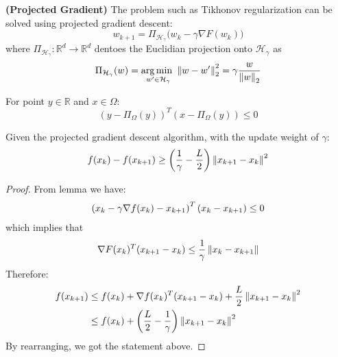 \begin{definition}{\textbf{(Projected Gradient)}}
    The problem such as Tikhonov regularization can be solved using projected gradient descent:
    \begin{equation*}
        w_{k+1} = \Pi_{\mathcal{H}_\gamma} \Big( w_k - \gamma\nabla F(w_k) \Big)
    \end{equation*}
    where $\Pi_{\mathcal{H}_\gamma} : \mathbb{R}^d\rightarrow \mathbb{R}^d$ dentoes the Euclidian projection onto $\mathcal{H}_\gamma$ as 
    \begin{equation*}
        \Pi_{\mathcal{H}_\gamma}(w) = \underset{w'\in\mathcal{H}_\gamma}{\arg\min \ }\left\lVert w-w'\right\rVert^2_2 = \gamma\frac{w}{\left\lVert w\right\rVert_2}
    \end{equation*}
\end{definition}

\begin{lemma}
    For point $y\in \mathbb{R}$ and $x\in\Omega$:
    \begin{equation*}
        (y-\Pi_\Omega(y))^T(x - \Pi_\Omega(y)) \le 0
    \end{equation*}
\end{lemma}

\begin{lemma}
    Given the projected gradient descent algorithm, with the update weight of $\gamma$:
    \begin{equation*}
        f(x_k) - f(x_{k+1}) \ge \left( \frac{1}{\gamma} - \frac{L}{2} \right)\left\lVert x_{k+1} - x_k\right\rVert^2
    \end{equation*}
\end{lemma}
\begin{proof}
    From lemma we have:
    \begin{equation*}
    \begin{aligned}
        \left( x_k - \gamma\nabla f(x_k) - x_{k+1} \right)^T(x_k - x_{k+1} ) \le 0
    \end{aligned}
    \end{equation*}
    which implies that 
    \begin{equation*}
        \nabla F(x_k)^T(x_{k+1} - x_k) \le \frac{1}{\gamma}\left\lVert x_k - x_{k+1}\right\rVert
    \end{equation*}
    Therefore:
    \begin{equation*}
    \begin{aligned}
        f(x_{k+1}) &\le f(x_k) + \nabla f(x_k)^T(x_{k+1} - x_k) + \frac{L}{2}\left\lVert x_{k+1} - x_k\right\rVert^2 \\ 
        &\le f(x_k) + \left( \frac{L}{2} - \frac{1}{\gamma} \right)\left\lVert x_{k+1} - x_k\right\rVert^2
    \end{aligned}
    \end{equation*}
    By rearranging, we got the statement above.
\end{proof}


